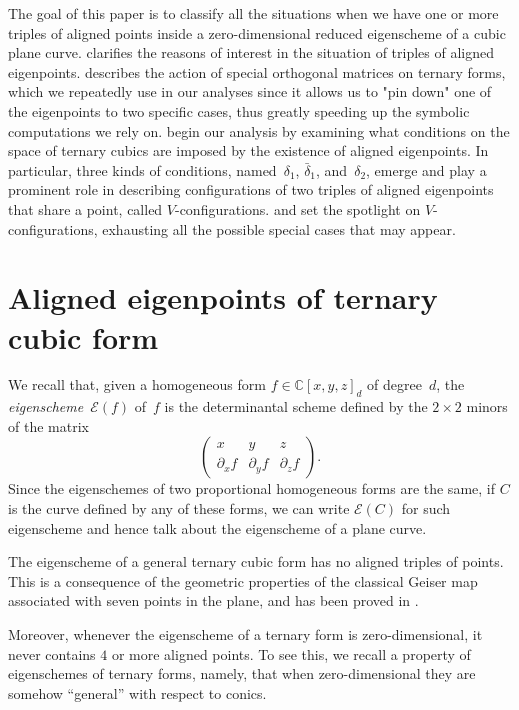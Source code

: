 \documentclass{amsart}
\theoremstyle{plain}
\theoremstyle{definition}
\newcommand{\C}{\mathbb{C}}
\newcommand{\de}{\partial}
\newcommand{\Eig}[1]{\mathcal{E}\!\left( {#1} \right)}
\begin{document}
The goal of this paper is to classify all the situations when we have one or more triples of aligned points inside a zero-dimensional reduced eigenscheme of a cubic plane curve.
 clarifies the reasons of interest in the situation of triples of aligned eigenpoints.
 describes the action of special orthogonal matrices on ternary forms, which we repeatedly use in our analyses since it allows us to "pin down" one of the eigenpoints to two specific cases, thus greatly speeding up the symbolic computations we rely on.
 begin our analysis by examining what conditions on the space of ternary cubics are imposed by the existence of aligned eigenpoints. In particular, three kinds of conditions, named~$\delta_1$, $\bar{\delta}_1$, and~$\delta_2$, emerge and play a prominent role in describing configurations of two triples of aligned eigenpoints that share a point, called $V$-configurations.
 and  set the spotlight on $V$-configurations, exhausting all the possible special cases that may appear.

\section{Aligned eigenpoints of ternary cubic form}
\label{aligned}

We recall that, given a homogeneous form $f \in \C[x,y,z]_d$ of degree~$d$, the \emph{eigenscheme}~$\Eig{f}$ of~$f$ is the determinantal scheme defined by the $2 \times 2$ minors of the matrix
%
\begin{equation}
\label{eq:def_matrix}
  \begin{pmatrix}
    x & y & z \\
    \de_x f & \de_y f & \de_z f
  \end{pmatrix}.
\end{equation}
%
Since the eigenschemes of two proportional homogeneous forms are the same,
if $C$ is the curve defined by any of these forms,
we can write $\Eig{C}$ for such eigenscheme and hence talk about the eigenscheme of a plane curve.

The eigenscheme of a general ternary cubic form has no aligned triples of points. This is a consequence of the geometric properties of the classical Geiser map associated with seven points in the plane, and has been proved in \cite[Proposition~4.5]{BGV}.

Moreover, whenever the eigenscheme of a ternary form is zero-dimensional, it never contains $4$ or more aligned points.
To see this, we recall a property of eigenschemes of ternary forms, namely,
that when zero-dimensional they are somehow ``general'' with respect to conics.
\end{document}
